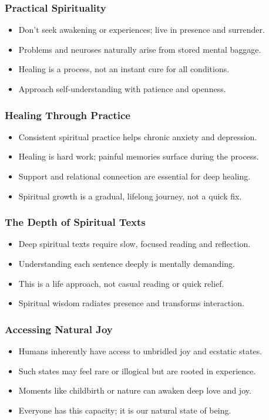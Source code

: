 \begin{frame}[fragile]\frametitle{Practical Spirituality}
  \begin{itemize}
    \item Don’t seek awakening or experiences; live in presence and surrender.
    \item Problems and neuroses naturally arise from stored mental baggage.
    \item Healing is a process, not an instant cure for all conditions.
    \item Approach self-understanding with patience and openness.
  \end{itemize}
\end{frame}

\begin{frame}[fragile]\frametitle{Healing Through Practice}
  \begin{itemize}
    \item Consistent spiritual practice helps chronic anxiety and depression.
    \item Healing is hard work; painful memories surface during the process.
    \item Support and relational connection are essential for deep healing.
    \item Spiritual growth is a gradual, lifelong journey, not a quick fix.
  \end{itemize}
\end{frame}

\begin{frame}[fragile]\frametitle{The Depth of Spiritual Texts}
  \begin{itemize}
    \item Deep spiritual texts require slow, focused reading and reflection.
    \item Understanding each sentence deeply is mentally demanding.
    \item This is a life approach, not casual reading or quick relief.
    \item Spiritual wisdom radiates presence and transforms interaction.
  \end{itemize}
\end{frame}

\begin{frame}[fragile]\frametitle{Accessing Natural Joy}
  \begin{itemize}
    \item Humans inherently have access to unbridled joy and ecstatic states.
    \item Such states may feel rare or illogical but are rooted in experience.
    \item Moments like childbirth or nature can awaken deep love and joy.
    \item Everyone has this capacity; it is our natural state of being.
  \end{itemize}
\end{frame}


